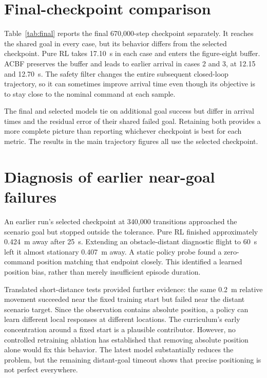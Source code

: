 \section{Final-checkpoint comparison}
Table~\ref{tab:final} reports the final 670,000-step checkpoint separately. It reaches the shared goal in every case, but its behavior differs from the selected checkpoint. Pure RL takes 17.10~s in each case and enters the figure-eight buffer. ACBF preserves the buffer and leads to earlier arrival in cases 2 and 3, at 12.15 and 12.70~s. The safety filter changes the entire subsequent closed-loop trajectory, so it can sometimes improve arrival time even though its objective is to stay close to the nominal command at each sample.

\begin{table}[htbp]\centering\small
\caption{Separate comparison using the final 670,000-step checkpoint. PID rows are repeated for consistent comparison and are not independent repeated trials.}\label{tab:final}

\end{table}

The final and selected models tie on additional goal success but differ in arrival times and the residual error of their shared failed goal. Retaining both provides a more complete picture than reporting whichever checkpoint is best for each metric. The results in the main trajectory figures all use the selected checkpoint.

\section{Diagnosis of earlier near-goal failures}
An earlier run's selected checkpoint at 340,000 transitions approached the scenario goal but stopped outside the tolerance. Pure RL finished approximately 0.424~m away after 25~s. Extending an obstacle-distant diagnostic flight to 60~s left it almost stationary 0.407~m away. A static policy probe found a zero-command position matching that endpoint closely. This identified a learned position bias, rather than merely insufficient episode duration.

Translated short-distance tests provided further evidence: the same 0.2~m relative movement succeeded near the fixed training start but failed near the distant scenario target. Since the observation contains absolute position, a policy can learn different local responses at different locations. The curriculum's early concentration around a fixed start is a plausible contributor. However, no controlled retraining ablation has established that removing absolute position alone would fix this behavior. The latest model substantially reduces the problem, but the remaining distant-goal timeout shows that precise positioning is not perfect everywhere.

